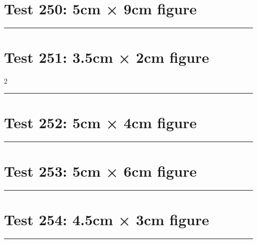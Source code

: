 \documentclass[a4paper,11pt]{article}
\begin{document}
\section*{Test 250: 5cm × 9cm figure}
\begin{swarmwrap}%
  \begin{minipage}[t]{5cm}
    \centering
    \rule{\linewidth}{9cm}
  \end{minipage}%
\end{swarmwrap}%
\swarmwrapnext
\lipsum[136]
\lipsum[137]
\lipsum[138]
\section*{Test 251: 3.5cm × 2cm figure}
\begin{multicols}{2}
  \begin{swarmwrap}%
    \begin{minipage}[t]{3cm}
      \centering
      \rule{\linewidth}{2cm}
    \end{minipage}%
  \end{swarmwrap}%
  \swarmwrapnext
  \lipsum[106]
  \lipsum[107]
  \lipsum[108]
  \lipsum[109]
\end{multicols}
\section*{Test 252: 5cm × 4cm figure}
\begin{swarmwrap}%
  \begin{minipage}[t]{5cm}
    \centering
    \rule{\linewidth}{4cm}
  \end{minipage}%
\end{swarmwrap}%
\swarmwrapnext
\lipsum[122]
\lipsum[123]
\lipsum[124]
\section*{Test 253: 5cm × 6cm figure}
\begin{swarmwrap}%
  \begin{minipage}[t]{5cm}
    \centering
    \rule{\linewidth}{6cm}
  \end{minipage}%
\end{swarmwrap}%
\swarmwrapnext
\lipsum[103]
\lipsum[104]
\lipsum[105]
\lipsum[106]
\lipsum[107]
\section*{Test 254: 4.5cm × 3cm figure}
\begin{swarmwrap}%
  \begin{minipage}[t]{4cm}
    \centering
    \rule{\linewidth}{3cm}
  \end{minipage}%
\end{swarmwrap}%
\swarmwrapnext
\lipsum[138]
\lipsum[139]
\lipsum[140]
\lipsum[141]
\lipsum[142]
\end{document}
